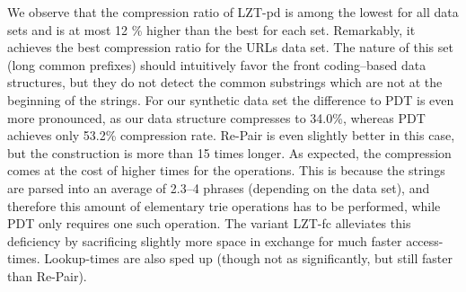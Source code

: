 \documentclass{llncs}
\begin{document}
\begin{table}[t]
\qquad
{}
\end{table}

We observe that the compression ratio of LZT-pd is among the lowest for all data sets and is at most 12 \% higher than the best for each set. Remarkably, it achieves the best compression ratio for the URLs data set.
The nature of this set (long common prefixes) should intuitively favor the front coding--based data structures, but they do not detect the common substrings which are not at the beginning of the strings.
For our synthetic data set the difference to PDT is even more pronounced, as our data structure compresses to 34.0\%, whereas PDT achieves only 53.2\% compression rate. Re-Pair is even slightly better in this case, but the construction is more than 15 times longer.
As expected, the compression comes at the cost of higher times for the operations. This is because the strings are parsed into an average of 2.3--4 phrases (depending on the data set), and therefore this amount of elementary trie operations has to be performed, while PDT only requires one such operation.
The variant LZT-fc alleviates this deficiency by sacrificing slightly more space in exchange for much faster access-times. Lookup-times are also sped up (though not as significantly, but still faster than Re-Pair).
\end{document}
